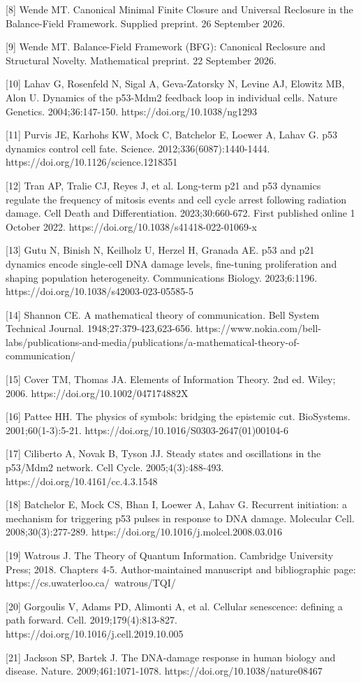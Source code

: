 \documentclass[11pt,a4paper]{article}
\begin{document}
[8] Wende MT. Canonical Minimal Finite Closure and Universal Reclosure in the Balance-Field Framework. Supplied preprint. 26 September 2026.

[9] Wende MT. Balance-Field Framework (BFG): Canonical Reclosure and Structural Novelty. Mathematical preprint. 22 September 2026.

[10] Lahav G, Rosenfeld N, Sigal A, Geva-Zatorsky N, Levine AJ, Elowitz MB, Alon U. Dynamics of the p53-Mdm2 feedback loop in individual cells. Nature Genetics. 2004;36:147-150. https://doi.org/10.1038/ng1293

[11] Purvis JE, Karhohs KW, Mock C, Batchelor E, Loewer A, Lahav G. p53 dynamics control cell fate. Science. 2012;336(6087):1440-1444. https://doi.org/10.1126/science.1218351

[12] Tran AP, Tralie CJ, Reyes J, et al. Long-term p21 and p53 dynamics regulate the frequency of mitosis events and cell cycle arrest following radiation damage. Cell Death and Differentiation. 2023;30:660-672. First published online 1 October 2022. https://doi.org/10.1038/s41418-022-01069-x

[13] Gutu N, Binish N, Keilholz U, Herzel H, Granada AE. p53 and p21 dynamics encode single-cell DNA damage levels, fine-tuning proliferation and shaping population heterogeneity. Communications Biology. 2023;6:1196. https://doi.org/10.1038/s42003-023-05585-5

[14] Shannon CE. A mathematical theory of communication. Bell System Technical Journal. 1948;27:379-423,623-656. https://www.nokia.com/bell-labs/publications-and-media/publications/a-mathematical-theory-of-communication/

[15] Cover TM, Thomas JA. Elements of Information Theory. 2nd ed. Wiley; 2006. https://doi.org/10.1002/047174882X

[16] Pattee HH. The physics of symbols: bridging the epistemic cut. BioSystems. 2001;60(1-3):5-21. https://doi.org/10.1016/S0303-2647(01)00104-6

[17] Ciliberto A, Novak B, Tyson JJ. Steady states and oscillations in the p53/Mdm2 network. Cell Cycle. 2005;4(3):488-493. https://doi.org/10.4161/cc.4.3.1548

[18] Batchelor E, Mock CS, Bhan I, Loewer A, Lahav G. Recurrent initiation: a mechanism for triggering p53 pulses in response to DNA damage. Molecular Cell. 2008;30(3):277-289. https://doi.org/10.1016/j.molcel.2008.03.016

[19] Watrous J. The Theory of Quantum Information. Cambridge University Press; 2018. Chapters 4-5. Author-maintained manuscript and bibliographic page: https://cs.uwaterloo.ca/~watrous/TQI/

[20] Gorgoulis V, Adams PD, Alimonti A, et al. Cellular senescence: defining a path forward. Cell. 2019;179(4):813-827. https://doi.org/10.1016/j.cell.2019.10.005

[21] Jackson SP, Bartek J. The DNA-damage response in human biology and disease. Nature. 2009;461:1071-1078. https://doi.org/10.1038/nature08467
\end{document}
